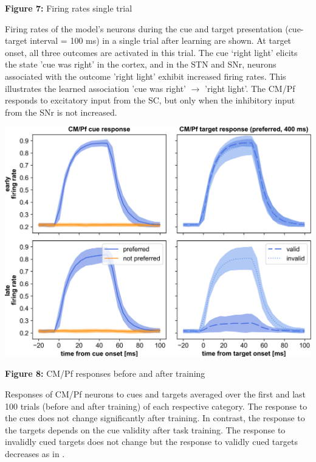 \documentclass[portrait,final,a0paper,fontscale=0.30]{baposter}
\begin{document}
\begin{poster}
{\begin{adjustbox}{minipage=\textwidth, margin=2pt, center}
\begin{minipage}{0.26\textwidth}
        \textbf{Figure 7:} Firing rates single trial
	\end{minipage}
    \hspace{0.01\textwidth}
	\begin{minipage}{0.18\textwidth}
        Firing rates of the model’s neurons during the cue and target presentation (cue-target interval = 100 ms) in a single trial after learning are shown. At target onset, all three outcomes are activated in this trial. The cue ‘right light’ elicits the state 'cue was right' in the cortex, and in the STN and SNr, neurons associated with the outcome 'right light' exhibit increased firing rates. This illustrates the learned association 'cue was right' $\rightarrow$ 'right light'. The CM/Pf responds to excitatory input from the SC, but only when the inhibitory input from the SNr is not increased.
	\end{minipage}
    \hspace{0.05\textwidth}
	\begin{minipage}{0.48\textwidth}  
        \begin{center}
            \includegraphics[width=0.75\linewidth]{figures/pf_response.png}
            
            \textbf{Figure 8:} CM/Pf responses before and after training \\
        \end{center}
        \vspace{5pt}
        Responses of CM/Pf neurons to cues and targets averaged over the first and last 100 trials (before and after training) of each respective category. The response to the cues does not change significantly after training. In contrast, the response to the targets depends on the cue validity after task training. The response to invalidly cued targets does not change but the response to validly cued targets decreases as in \parencite{minamimoto_participation_2002}.
	\end{minipage}
    \hfill
  

\end{adjustbox}}
\end{poster}
\end{document}
